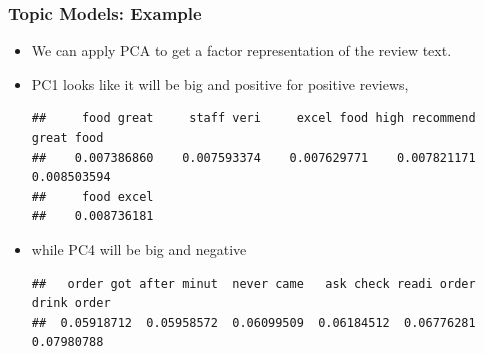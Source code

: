 \documentclass[
  shownotes,
  xcolor={svgnames},
  hyperref={colorlinks,citecolor=DarkBlue,linkcolor=DarkRed,urlcolor=DarkBlue}
  , aspectratio=169]{beamer}
\newenvironment{Shaded}{\begin{snugshade}}{\end{snugshade}}
\newcommand{\CommentTok}[1]{\textcolor[rgb]{0.56,0.35,0.01}{\textit{#1}}}
\newcommand{\DataTypeTok}[1]{\textcolor[rgb]{0.13,0.29,0.53}{#1}}
\newcommand{\DecValTok}[1]{\textcolor[rgb]{0.00,0.00,0.81}{#1}}
\newcommand{\KeywordTok}[1]{\textcolor[rgb]{0.13,0.29,0.53}{\textbf{#1}}}
\newcommand{\NormalTok}[1]{#1}
\newcommand{\OperatorTok}[1]{\textcolor[rgb]{0.81,0.36,0.00}{\textbf{#1}}}
\newcommand{\OtherTok}[1]{\textcolor[rgb]{0.56,0.35,0.01}{#1}}
\newcommand{\StringTok}[1]{\textcolor[rgb]{0.31,0.60,0.02}{#1}}
\begin{document}
\begin{frame}[fragile]
\frametitle{Topic Models: Example}


\begin{itemize}


\item We can apply PCA to get a factor representation of the review text. 
\item  PC1 looks like it will be big and positive for positive reviews, 

\begin{scriptsize}

\begin{Shaded}
\end{Shaded}

\end{scriptsize}
\begin{tiny}

\begin{verbatim}
##     food great     staff veri     excel food high recommend     great food 
##    0.007386860    0.007593374    0.007629771    0.007821171    0.008503594 
##     food excel 
##    0.008736181
\end{verbatim}

\end{tiny}
\medskip



\item while PC4 will be big and negative 
\begin{scriptsize}
\begin{Shaded}
\end{Shaded}
\end{scriptsize}
\begin{tiny}

\begin{verbatim}
##   order got after minut  never came   ask check readi order drink order 
##  0.05918712  0.05958572  0.06099509  0.06184512  0.06776281  0.07980788
\end{verbatim}
\end{tiny}




\end{itemize}
\end{frame}
\end{document}
